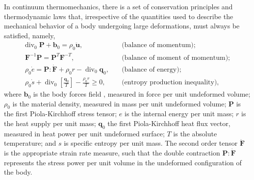 In continuum thermomechanics, there is a set of conservation principles and thermodynamic laws that, irrespective of the quantities used to describe the mechanical behavior of a body undergoing large deformations, must always be satisfied, namely,
\begin{align}
  \text{div}_0\;\bm{P} + \bm{b}_0 = \rho_0 \ddot{\bm{u}},\quad & \text{(balance of momentum)};
                                                                 \label{eq:material_equilibrium}\\
  \bm{F}^{-1}\bm{P} = \bm{P}^{T}\bm{F} ^{-T},\quad & \text{(balance of moment of momentum)};\\
  \rho_0 \dot e = \bm{P} :\dot{\bm{F}} + \rho_0 r -\operatorname{div}_0 \bm{q}_0,\quad & \text{(balance of energy)};\label{eq:balance_energy}\\
  \rho_0 \dot s + \operatorname{div}_0 \left[\frac{\bm{q}_0}{T}\right] - \frac{\rho_0 r}{T} \geq 0,\quad & \text{(entropy production inequality)}\label{eq:entropy_production},
\end{align}
where $\bm{b}_0$ is the body forces field , measured in force per unit undeformed volume; $\rho_0$ is the material density, measured in mass per unit undeformed volume; \(\bm{P}\) is the first Piola-Kirchhoff stress tensor; \(e\) is the internal energy per unit mass; \(r\) is the heat supply per unit mass; \(\bm{q}_0\) the first Piola-Kirchhoff heat flux vector, measured in heat power per unit undeformed surface; $T$ is the absolute temperature; and $s$ is specific entropy per unit mass.
The second order tensor $\dot{\bm{F}}$ is the appropriate strain rate measure, such that the double contraction $\bm{P}:\dot{\bm{F}}$ represents the stress power per unit volume in the undeformed configuration of the body.

